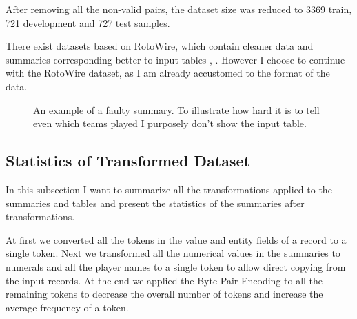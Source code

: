 After removing all the non-valid pairs, the dataset size was reduced to 3369 train, 721 development and 727 test samples.

There exist datasets based on RotoWire, which contain cleaner data and summaries corresponding better to input tables \citep{wang-2019-revisiting}, \citep{thomson-2020-sportsett}. However I choose to continue with the RotoWire dataset, as I am already accustomed to the format of the data.

\begin{figure}[h]
    \caption{\centering An example of a faulty summary. To illustrate how hard it is to tell even which teams played I purposely don't show the input table.} \label{faulty_summary}
\end{figure}

\subsection{Statistics of Transformed Dataset}

In this subsection I want to summarize all the transformations applied to the summaries and tables and present the statistics of the summaries after transformations.

At first we converted all the tokens in the value and entity fields of a record to a single token. Next we transformed all the numerical values in the summaries to numerals and all the player names to a single token to allow direct copying from the input records. At the end we applied the Byte Pair Encoding to all the remaining tokens to decrease the overall number of tokens and increase the average frequency of a token.

